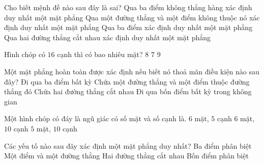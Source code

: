 \begin{ex}%
	Cho  biết mệnh đề nào sau đây là sai?
	\choice 
		{Qua ba điểm không thẳng hàng xác định duy nhất một mặt  phẳng}
		{Qua một đường thẳng và một điểm không  thuộc nó xác định duy nhất một mặt phẳng}
		{\True Qua ba điểm xác định duy nhất một mặt phẳng} 
		{Qua  hai đường thẳng cắt nhau xác định duy nhất một mặt phẳng}
\end{ex}

\begin{ex}%
	Hình chóp có $16$ cạnh thì có bao nhiêu mặt? 
		{$8$} 
		{$7$} 
		{\True $9$} 
\end{ex}

\begin{ex}%
	Một mặt phẳng hoàn toàn được xác định nếu biết nó thoả  mãn điều kiện nào sau đây?
	 \choice
		 {Đi qua ba điểm bất kỳ}
		{Chứa  một đường thẳng và một điểm thuộc đường thẳng đó}
		{\True Chứa hai  đường thẳng cắt nhau}
		{Đi qua bốn điểm bất kỳ trong không gian} 
\end{ex}

\begin{ex}%
	Một hình  chóp có đáy là ngũ giác có số mặt và số cạnh là.
		{$6$ mặt, $5$  cạnh}
		{\True $6$ mặt, $10$  cạnh}
		{$5$ mặt, $10$  cạnh}
\end{ex}

\begin{ex}%
	Các yếu tố nào sau đây  xác định một mặt phẳng duy nhất?
	 \choice
		{Ba điểm phân  biệt}
		{Một điểm và một đường  thẳng}
		{\True Hai  đường thẳng cắt nhau}
		 {Bốn điểm phân biệt}
\end{ex}

